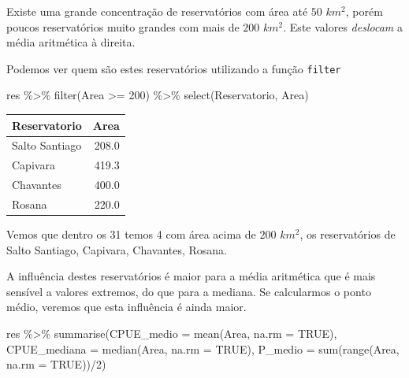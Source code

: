 \documentclass[
]{book}
\newenvironment{Shaded}{\begin{snugshade}}{\end{snugshade}}
\newcommand{\AttributeTok}[1]{\textcolor[rgb]{0.77,0.63,0.00}{#1}}
\newcommand{\ConstantTok}[1]{\textcolor[rgb]{0.00,0.00,0.00}{#1}}
\newcommand{\DecValTok}[1]{\textcolor[rgb]{0.00,0.00,0.81}{#1}}
\newcommand{\FunctionTok}[1]{\textcolor[rgb]{0.00,0.00,0.00}{#1}}
\newcommand{\NormalTok}[1]{#1}
\newcommand{\SpecialCharTok}[1]{\textcolor[rgb]{0.00,0.00,0.00}{#1}}
\begin{document}
Existe uma grande concentração de reservatórios com área até \(50\) \(km^2\), porém poucos reservatórios muito grandes com mais de \(200\) \(km^2\). Este valores \emph{deslocam} a média aritmética à direita.

Podemos ver quem são estes reservatórios utilizando a função \texttt{filter}

\begin{Shaded}
\begin{Highlighting}[]
\NormalTok{res }\SpecialCharTok{\%\textgreater{}\%} 
  \FunctionTok{filter}\NormalTok{(Area }\SpecialCharTok{\textgreater{}=} \DecValTok{200}\NormalTok{) }\SpecialCharTok{\%\textgreater{}\%} 
  \FunctionTok{select}\NormalTok{(Reservatorio, Area)}
\end{Highlighting}
\end{Shaded}

\begin{tabular}{l|r}
\hline
Reservatorio & Area\\
\hline
Salto Santiago & 208.0\\
\hline
Capivara & 419.3\\
\hline
Chavantes & 400.0\\
\hline
Rosana & 220.0\\
\hline
\end{tabular}

Vemos que dentro os 31 temos 4 com área acima de \(200\) \(km^2\), os reservatórios de Salto Santiago, Capivara, Chavantes, Rosana.

A influência destes reservatórios é maior para a média aritmética que é mais sensível a valores extremos, do que para a mediana. Se calcularmos o ponto médio, veremos que esta influência é ainda maior.

\begin{Shaded}
\begin{Highlighting}[]
\NormalTok{res }\SpecialCharTok{\%\textgreater{}\%} 
  \FunctionTok{summarise}\NormalTok{(}\AttributeTok{CPUE\_medio =} \FunctionTok{mean}\NormalTok{(Area, }\AttributeTok{na.rm =} \ConstantTok{TRUE}\NormalTok{),}
            \AttributeTok{CPUE\_mediana =} \FunctionTok{median}\NormalTok{(Area, }\AttributeTok{na.rm =} \ConstantTok{TRUE}\NormalTok{),}
            \AttributeTok{P\_medio =} \FunctionTok{sum}\NormalTok{(}\FunctionTok{range}\NormalTok{(Area, }\AttributeTok{na.rm =} \ConstantTok{TRUE}\NormalTok{))}\SpecialCharTok{/}\DecValTok{2}\NormalTok{)}
\end{Highlighting}
\end{Shaded}
\end{document}

